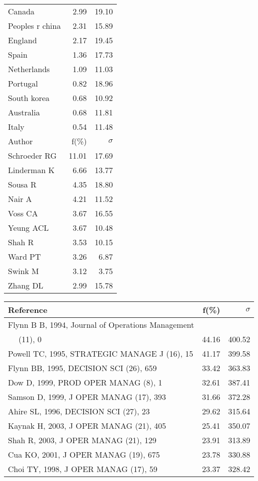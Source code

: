 \documentclass[a4paper,11pt]{report}
\begin{document}
\begin{landscape}
\begin{table}[!ht]
{\begin{tabular}{|l r r|}
Canada & 2.99 & 19.10\\
Peoples r china & 2.31 & 15.89\\
England & 2.17 & 19.45\\
Spain & 1.36 & 17.73\\
Netherlands & 1.09 & 11.03\\
Portugal & 0.82 & 18.96\\
South korea & 0.68 & 10.92\\
Australia & 0.68 & 11.81\\
Italy & 0.54 & 11.48\\
\hline
\hline
Author & f(\%) & $\sigma$\\
\hline
Schroeder RG & 11.01 & 17.69\\
Linderman K & 6.66 & 13.77\\
Sousa R & 4.35 & 18.80\\
Nair A & 4.21 & 11.52\\
Voss CA & 3.67 & 16.55\\
Yeung ACL & 3.67 & 10.48\\
Shah R & 3.53 & 10.15\\
Ward PT & 3.26 & 6.87\\
Swink M & 3.12 & 3.75\\
Zhang DL & 2.99 & 15.78\\
\hline
\end{tabular}
}
{\scriptsize\begin{tabular}{|l r r|}
\hline
Reference & f(\%) & $\sigma$\\
\hline
Flynn B B, 1994, Journal of Operations Management &  & \\
$\quad$ (11), 0 & 44.16 & 400.52\\
Powell TC, 1995, STRATEGIC MANAGE J (16), 15 & 41.17 & 399.58\\
Flynn BB, 1995, DECISION SCI (26), 659 & 33.42 & 363.83\\
Dow D, 1999, PROD OPER MANAG (8), 1 & 32.61 & 387.41\\
Samson D, 1999, J OPER MANAG (17), 393 & 31.66 & 372.28\\
Ahire SL, 1996, DECISION SCI (27), 23 & 29.62 & 315.64\\
Kaynak H, 2003, J OPER MANAG (21), 405 & 25.41 & 350.07\\
Shah R, 2003, J OPER MANAG (21), 129 & 23.91 & 313.89\\
Cua KO, 2001, J OPER MANAG (19), 675 & 23.78 & 330.88\\
Choi TY, 1998, J OPER MANAG (17), 59 & 23.37 & 328.42\\

\end{tabular}}
\end{table}
\end{landscape}
\end{document}
